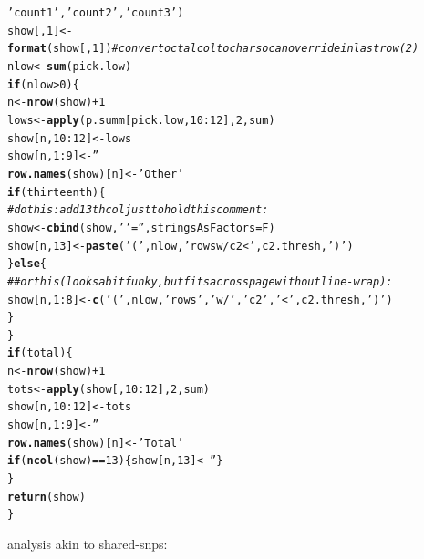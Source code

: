 \documentclass{article}\usepackage[]{graphicx}\usepackage[]{color}
\makeatletter
\newcommand{\hlnum}[1]{\textcolor[rgb]{0.686,0.059,0.569}{#1}}%
\newcommand{\hlstr}[1]{\textcolor[rgb]{0.192,0.494,0.8}{#1}}%
\newcommand{\hlcom}[1]{\textcolor[rgb]{0.678,0.584,0.686}{\textit{#1}}}%
\newcommand{\hlopt}[1]{\textcolor[rgb]{0,0,0}{#1}}%
\newcommand{\hlstd}[1]{\textcolor[rgb]{0.345,0.345,0.345}{#1}}%
\newcommand{\hlkwa}[1]{\textcolor[rgb]{0.161,0.373,0.58}{\textbf{#1}}}%
\newcommand{\hlkwb}[1]{\textcolor[rgb]{0.69,0.353,0.396}{#1}}%
\newcommand{\hlkwc}[1]{\textcolor[rgb]{0.333,0.667,0.333}{#1}}%
\newcommand{\hlkwd}[1]{\textcolor[rgb]{0.737,0.353,0.396}{\textbf{#1}}}%
\newenvironment{kframe}{%
 \def\at@end@of@kframe{}%
 \ifinner\ifhmode%
  \def\at@end@of@kframe{\end{minipage}}%
  \begin{minipage}{\columnwidth}%
 \fi\fi%
 \def\FrameCommand##1{\hskip\@totalleftmargin \hskip-\fboxsep
 \colorbox{shadecolor}{##1}\hskip-\fboxsep
     \hskip-\linewidth \hskip-\@totalleftmargin \hskip\columnwidth}%
 \MakeFramed {\advance\hsize-\width
   \@totalleftmargin\z@ \linewidth\hsize
   \@setminipage}}%
 {\par\unskip\endMakeFramed%
 \at@end@of@kframe}
\newenvironment{knitrout}{}{} %
\makeatother
\begin{document}
\begin{knitrout}
\begin{kframe}
\begin{alltt}
                      \hlstr{'count1'}\hlstd{,} \hlstr{'count2'}\hlstd{,} \hlstr{'count3'}\hlstd{)}
  \hlstd{show[,}\hlnum{1}\hlstd{]} \hlkwb{<-} \hlkwd{format}\hlstd{(show[,}\hlnum{1}\hlstd{])}  \hlcom{# convert octal col to char so can override in last row(2)}
  \hlstd{nlow} \hlkwb{<-} \hlkwd{sum}\hlstd{(pick.low)}
  \hlkwa{if}\hlstd{(nlow} \hlopt{>} \hlnum{0}\hlstd{)\{}
    \hlstd{n} \hlkwb{<-} \hlkwd{nrow}\hlstd{(show)}\hlopt{+}\hlnum{1}
    \hlstd{lows} \hlkwb{<-} \hlkwd{apply}\hlstd{(p.summ[pick.low,}\hlnum{10}\hlopt{:}\hlnum{12}\hlstd{],}\hlnum{2}\hlstd{,sum)}
    \hlstd{show[n,}\hlnum{10}\hlopt{:}\hlnum{12}\hlstd{]} \hlkwb{<-} \hlstd{lows}
    \hlstd{show[n,}\hlnum{1}\hlopt{:}\hlnum{9}\hlstd{]} \hlkwb{<-} \hlstr{''}
    \hlkwd{row.names}\hlstd{(show)[n]} \hlkwb{<-} \hlstr{'Other'}
    \hlkwa{if}\hlstd{(thirteenth)\{}
      \hlcom{# do this: add 13th col just to hold this comment:}
      \hlstd{show} \hlkwb{<-} \hlkwd{cbind}\hlstd{(show,}\hlstr{' '}\hlstd{=}\hlstr{''}\hlstd{,} \hlkwc{stringsAsFactors}\hlstd{=F)}
      \hlstd{show[n,}\hlnum{13}\hlstd{]} \hlkwb{<-} \hlkwd{paste}\hlstd{(}\hlstr{'('}\hlstd{, nlow,} \hlstr{'rows w/ c2 <'}\hlstd{, c2.thresh,} \hlstr{')'}\hlstd{)}
    \hlstd{\}} \hlkwa{else} \hlstd{\{}
      \hlcom{## or this (looks a bit funky, but fits across page without line-wrap): }
      \hlstd{show[n,}\hlnum{1}\hlopt{:}\hlnum{8}\hlstd{]} \hlkwb{<-}\hlkwd{c}\hlstd{(}\hlstr{'('}\hlstd{, nlow,} \hlstr{'rows'}\hlstd{,} \hlstr{'w/'}\hlstd{,} \hlstr{'c2'}\hlstd{,} \hlstr{'<'}\hlstd{, c2.thresh,} \hlstr{')'}\hlstd{)}
    \hlstd{\}}
  \hlstd{\}}
  \hlkwa{if}\hlstd{(total)\{}
    \hlstd{n} \hlkwb{<-} \hlkwd{nrow}\hlstd{(show)}\hlopt{+}\hlnum{1}
    \hlstd{tots} \hlkwb{<-} \hlkwd{apply}\hlstd{(show[,}\hlnum{10}\hlopt{:}\hlnum{12}\hlstd{],}\hlnum{2}\hlstd{,sum)}
    \hlstd{show[n,}\hlnum{10}\hlopt{:}\hlnum{12}\hlstd{]} \hlkwb{<-} \hlstd{tots}
    \hlstd{show[n,}\hlnum{1}\hlopt{:}\hlnum{9}\hlstd{]} \hlkwb{<-} \hlstr{''}
    \hlkwd{row.names}\hlstd{(show)[n]} \hlkwb{<-} \hlstr{'Total'}
    \hlkwa{if}\hlstd{(}\hlkwd{ncol}\hlstd{(show)}\hlopt{==}\hlnum{13}\hlstd{)\{show[n,}\hlnum{13}\hlstd{]}\hlkwb{<-}\hlstr{''}\hlstd{\}}
  \hlstd{\}}
  \hlkwd{return}\hlstd{(show)}
\hlstd{\}}
\end{alltt}
\end{kframe}
\end{knitrout}

analysis akin to shared-snps:
\end{document}
